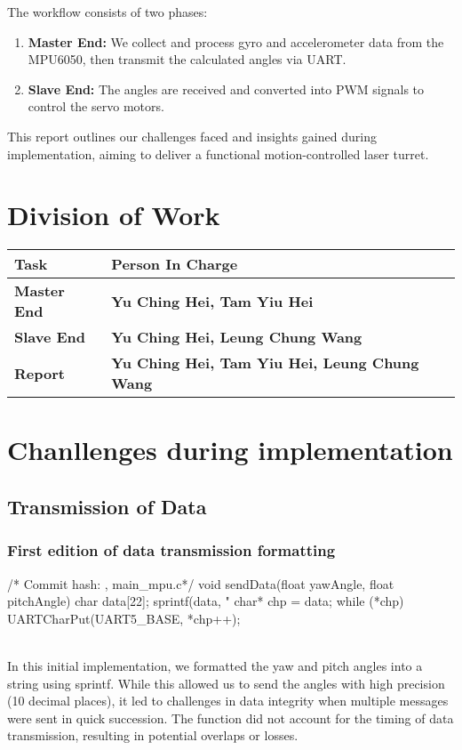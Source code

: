 \documentclass[12pt, a4paper]{article}
\begin{document}
\noindent The workflow consists of two phases:
\begin{enumerate}
    \item \textbf{Master End:} We collect and process gyro and accelerometer 
          data from the \\MPU6050, then transmit the calculated angles via UART.
    \item \textbf{Slave End:} The angles are received and converted into PWM 
          signals to control the servo motors.
\end{enumerate}
This report outlines our challenges faced and insights gained during implementation, aiming to deliver a functional motion-controlled laser turret.

\section{Division of Work}
\begin{tabularx}{\textwidth}{|l||X|}
    \hline
    \textbf{Task} & \textbf{Person In Charge} \\
    \hline\hline
    \textbf{Master End} & \textbf{Yu Ching Hei, Tam Yiu Hei} \\
    \hline
    \textbf{Slave End} & \textbf{Yu Ching Hei, Leung Chung Wang} \\
    \hline
    \textbf{Report} & \textbf{Yu Ching Hei, Tam Yiu Hei, Leung Chung Wang} \\
    \hline
\end{tabularx}

\section{Chanllenges during implementation}
\subsection{Transmission of Data}
\subsubsection{First edition of data transmission formatting}\text{}
\begin{code}
/* Commit hash: , main_mpu.c*/
void sendData(float yawAngle, float pitchAngle) {
    char data[22];
    sprintf(data, "%
    char* chp = data;
    while (*chp) 
        UARTCharPut(UART5_BASE, *chp++);
}
\end{code}\text{}\\
In this initial implementation, we formatted the yaw and pitch angles into a string using sprintf. 
While this allowed us to send the angles with high precision (10 decimal places), 
it led to challenges in data integrity when multiple messages were sent in quick succession. 
The function did not account for the timing of data transmission, resulting in potential overlaps 
or losses.
\end{document}
